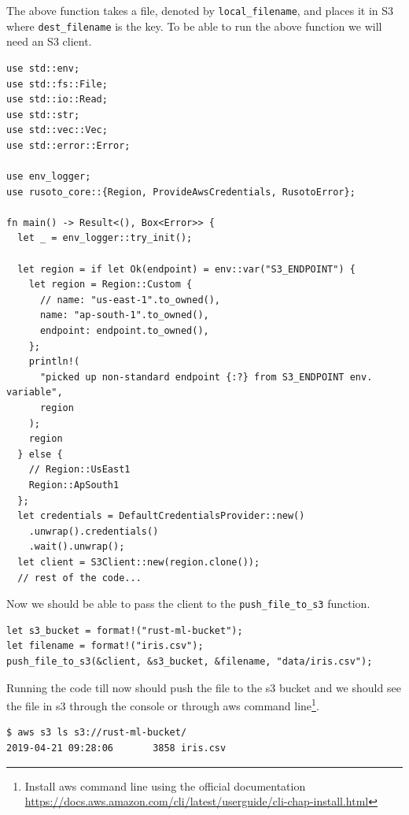 \documentclass{book}
\begin{document}
The above function takes a file, denoted by \lstinline{local_filename}, and places it in S3 where \lstinline{dest_filename} is the key. To be able to run the above function we will need an S3 client.

\begin{lstlisting}[caption={},basicstyle=\small]
use std::env;
use std::fs::File;
use std::io::Read;
use std::str;
use std::vec::Vec;
use std::error::Error;

use env_logger;
use rusoto_core::{Region, ProvideAwsCredentials, RusotoError};

fn main() -> Result<(), Box<Error>> {
  let _ = env_logger::try_init();

  let region = if let Ok(endpoint) = env::var("S3_ENDPOINT") {
    let region = Region::Custom {
      // name: "us-east-1".to_owned(),
      name: "ap-south-1".to_owned(),
      endpoint: endpoint.to_owned(),
    };
    println!(
      "picked up non-standard endpoint {:?} from S3_ENDPOINT env. variable",
      region
    );
    region
  } else {
    // Region::UsEast1
    Region::ApSouth1
  };
  let credentials = DefaultCredentialsProvider::new()
    .unwrap().credentials()
    .wait().unwrap();
  let client = S3Client::new(region.clone());
  // rest of the code...
\end{lstlisting}

Now we should be able to pass the client to the \lstinline{push_file_to_s3} function.

\begin{lstlisting}[caption={chapter4\\/working\_with\_data\\/s3\_files\\/src\\/main\\.rs},basicstyle=\small]
let s3_bucket = format!("rust-ml-bucket");
let filename = format!("iris.csv");
push_file_to_s3(&client, &s3_bucket, &filename, "data/iris.csv");
\end{lstlisting}

Running the code till now should push the file to the s3 bucket and we should see the file in s3 through the console or through aws command line\footnote{Install aws command line using the official documentation \href{}{https://docs.aws.amazon.com/cli/latest/userguide/cli-chap-install.html}}.

\begin{lstlisting}[caption={bash},basicstyle=\small]
$ aws s3 ls s3://rust-ml-bucket/
2019-04-21 09:28:06       3858 iris.csv
\end{lstlisting}
\end{document}

